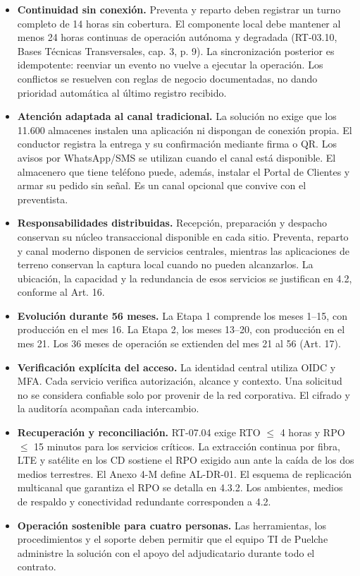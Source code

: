 \begin{itemize}
  \item \textbf{Continuidad sin conexión.} Preventa y reparto deben registrar un turno completo de 14 horas sin cobertura. El componente local debe mantener al menos 24 horas continuas de operación autónoma y degradada (RT-03.10, Bases Técnicas Transversales, cap. 3, p. 9). La sincronización posterior es idempotente: reenviar un evento no vuelve a ejecutar la operación. Los conflictos se resuelven con reglas de negocio documentadas, no dando prioridad automática al último registro recibido.
  \item \textbf{Atención adaptada al canal tradicional.} La solución no exige que los 11.600 almacenes instalen una aplicación ni dispongan de conexión propia. El conductor registra la entrega y su confirmación mediante firma o QR. Los avisos por WhatsApp/SMS se utilizan cuando el canal está disponible. El almacenero que tiene teléfono puede, además, instalar el Portal de Clientes y armar su pedido sin señal. Es un canal opcional que convive con el preventista.
  \item \textbf{Responsabilidades distribuidas.} Recepción, preparación y despacho conservan su núcleo transaccional disponible en cada sitio. Preventa, reparto y canal moderno disponen de servicios centrales, mientras las aplicaciones de terreno conservan la captura local cuando no pueden alcanzarlos. La ubicación, la capacidad y la redundancia de esos servicios se justifican en 4.2, conforme al Art. 16.
  \item \textbf{Evolución durante 56 meses.} La Etapa 1 comprende los meses 1--15, con producción en el mes 16. La Etapa 2, los meses 13--20, con producción en el mes 21. Los 36 meses de operación se extienden del mes 21 al 56 (Art. 17).
  \item \textbf{Verificación explícita del acceso.} La identidad central utiliza OIDC y MFA. Cada servicio verifica autorización, alcance y contexto. Una solicitud no se considera confiable solo por provenir de la red corporativa. El cifrado y la auditoría acompañan cada intercambio.
  \item \textbf{Recuperación y reconciliación.} RT-07.04 exige RTO $\leq$ 4 horas y RPO $\leq$ 15 minutos para los servicios críticos. La extracción continua por fibra, LTE y satélite en los CD sostiene el RPO exigido aun ante la caída de los dos medios terrestres. El Anexo 4-M define AL-DR-01. El esquema de replicación multicanal que garantiza el RPO se detalla en 4.3.2. Los ambientes, medios de respaldo y conectividad redundante corresponden a 4.2.
  \item \textbf{Operación sostenible para cuatro personas.} Las herramientas, los procedimientos y el soporte deben permitir que el equipo TI de Puelche administre la solución con el apoyo del adjudicatario durante todo el contrato.
\end{itemize}

